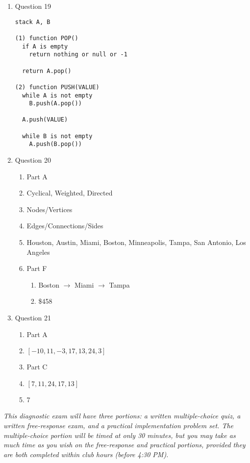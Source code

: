 \documentclass[11pt,addpoints]{exam}
\begin{document}
\begin{enumerate}[resume]
\item Question 19
\begin{verbatim}
stack A, B

(1) function POP()
  if A is empty
    return nothing or null or -1

  return A.pop()

(2) function PUSH(VALUE)
  while A is not empty
    B.push(A.pop())

  A.push(VALUE)

  while B is not empty
    A.push(B.pop())

\end{verbatim}

\item Question 20
  \begin{enumerate}[label=(\Alph*)]
    \item Part A
      
    \item Cyclical, Weighted, Directed
    \item Nodes/Vertices
    \item Edges/Connections/Sides
    \item Houston, Austin, Miami, Boston, Minneapolis, Tampa, San Antonio, Los Angeles
    \item Part F
      \begin{enumerate}[label=(\alph*)]
        \item Boston $\to$ Miami $\to$ Tampa
        \item \$458
      \end{enumerate}
  \end{enumerate}

\item Question 21
  \begin{enumerate}[label=(\Alph*)]
    \item Part A
      
    \item $[-10, 11, -3, 17, 13, 24, 3]$
    \item Part C
      
    \item $[7, 11, 24, 17, 13]$
    \item 7
  \end{enumerate}

\end{enumerate}

\newpage

\noindent
\textit{This diagnostic exam will have three portions: a written multiple-choice quiz, a written free-response exam, and a practical implementation problem set. The multiple-choice portion will be timed at only 30 minutes, but you may take as much time as you wish on the free-response and practical portions, provided they are both completed within club hours (before 4:30 PM).}
\end{document}
